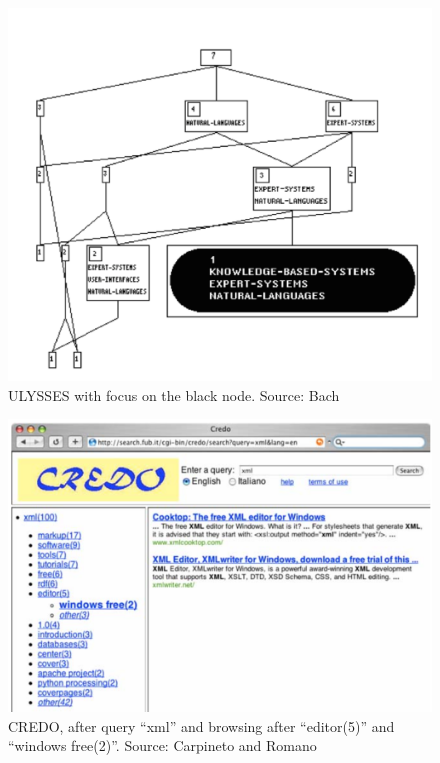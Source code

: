 \documentclass[11pt]{report}
\begin{document}
\begin{figure}[!ht]
	\centering
	\includegraphics[width=\linewidth]{images/ulysses}
\caption{ULYSSES with focus on the black node. Source: Bach \cite{Bach2010} }
\label{figure:ulysses}
\end{figure}

\begin{figure}[!ht]
	\centering
	\includegraphics[width=\linewidth]{images/credo}
\caption{CREDO, after query ``xml'' and browsing after ``editor(5)'' and ``windows free(2)''. Source: Carpineto and Romano \cite{Carpineto2004} }
\label{figure:credo}
\end{figure}
\end{document}
